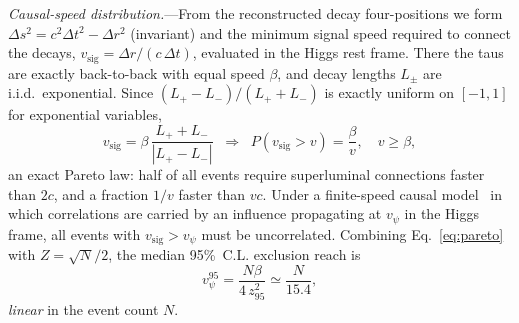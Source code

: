 \documentclass[prl,twocolumn,superscriptaddress,floatfix]{revtex4-2}
\newcommand{\vpsi}{v_\psi}
\newcommand{\vsig}{v_{\mathrm{sig}}}
\begin{document}
\textit{Causal-speed distribution.}---From the reconstructed decay
four-positions we form $\Delta s^2=c^2\Delta t^2-\Delta r^2$
(invariant) and the minimum signal speed required to connect the
decays, $\vsig=\Delta r/(c\,\Delta t)$, evaluated in the Higgs rest
frame.  There the taus are exactly back-to-back with equal speed
$\beta$, and decay lengths $L_\pm$ are i.i.d.\ exponential.  Since
$(L_+-L_-)/(L_++L_-)$ is exactly uniform on $[-1,1]$ for exponential
variables,
\begin{equation}
  \vsig = \beta\,\frac{L_+ + L_-}{|L_+ - L_-|}
  \;\;\Longrightarrow\;\;
  P(\vsig > v) = \frac{\beta}{v}, \quad v\ge\beta,
  \label{eq:pareto}
\end{equation}
an exact Pareto law: half of all events require superluminal
connections faster than $2c$, and a fraction $1/v$ faster than $vc$.
Under a finite-speed causal model~\cite{Eberhard1989,Salart2008} in
which correlations are carried by an influence propagating at
$\vpsi$ in the Higgs frame, all events with $\vsig>\vpsi$ must be
uncorrelated.  Combining Eq.~\eqref{eq:pareto} with $Z=\sqrt{N}/2$,
the median 95\%~C.L. exclusion reach is
\begin{equation}
  \vpsi^{95} = \frac{N\beta}{4\,z_{95}^2} \simeq \frac{N}{15.4},
  \label{eq:reach}
\end{equation}
\emph{linear} in the event count $N$.

\end{document}
